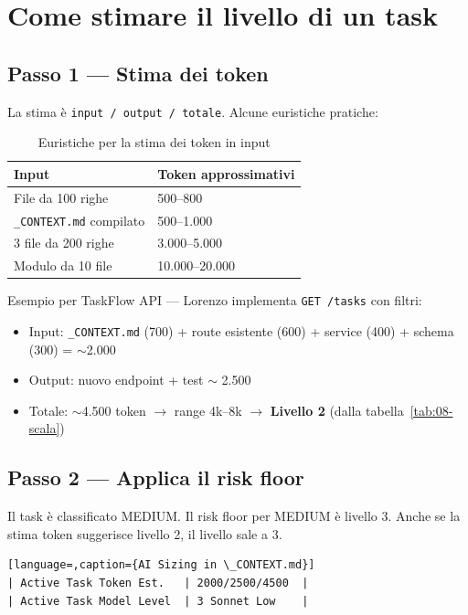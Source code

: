 \section{Come stimare il livello di un task}
\label{sec:08-stima}

\subsection*{Passo 1 --- Stima dei token}

La stima è \texttt{input / output / totale}. Alcune euristiche pratiche:

\begin{table}[htbp]
  \centering
  \begin{tabular}{ll}
    \toprule
    \textbf{Input} & \textbf{Token approssimativi} \\
    \midrule
    File da 100 righe & 500--800 \\
    \texttt{\_CONTEXT.md} compilato & 500--1.000 \\
    3 file da 200 righe & 3.000--5.000 \\
    Modulo da 10 file & 10.000--20.000 \\
    \bottomrule
  \end{tabular}
  \caption{Euristiche per la stima dei token in input}
  \label{tab:08-euristiche}
\end{table}

Esempio per TaskFlow API --- Lorenzo implementa \texttt{GET /tasks} con filtri:
\begin{itemize}
  \item Input: \texttt{\_CONTEXT.md} (700) + route esistente (600) + service (400) + schema (300) = $\sim$2.000
  \item Output: nuovo endpoint + test $\sim$ 2.500
  \item Totale: $\sim$4.500 token $\to$ range 4k--8k $\to$ \textbf{Livello 2} (dalla tabella~\ref{tab:08-scala})
\end{itemize}

\subsection*{Passo 2 --- Applica il risk floor}

Il task è classificato MEDIUM. Il risk floor per MEDIUM è livello 3. Anche se la stima token suggerisce livello 2, il livello sale a 3.

\begin{lstlisting}[language=,caption={AI Sizing in \_CONTEXT.md}]
| Active Task Token Est.   | 2000/2500/4500  |
| Active Task Model Level  | 3 Sonnet Low    |
\end{lstlisting}

